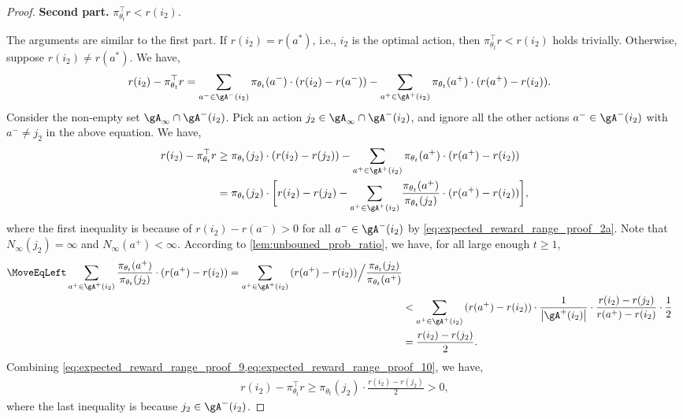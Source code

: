 \begin{proof}
\textbf{Second part.} $\pi_{\theta_t}^\top r < r(i_2)$.

The arguments are similar to the first part. If $r(i_2) = r(a^*)$, i.e., $i_2$ is the optimal action, then $\pi_{\theta_t}^\top r < r(i_2)$ holds trivially. Otherwise, suppose $r(i_2) \ne r(a^*)$. We have,
\begin{align}
\label{eq:expected_reward_range_proof_8}
    r(i_2) - \pi_{\theta_t}^\top r &= \sum_{a^- \in \gA^-(i_2)}{ \pi_{\theta_t}(a^-) \cdot (r(i_2) - r(a^-) ) } - \sum_{a^+ \in \gA^+(i_2)}{ \pi_{\theta_t}(a^+) \cdot ( r(a^+) - r(i_2)) }.
\end{align}
Consider the non-empty set $\gA_\infty \cap \gA^-(i_2)$. Pick an action $j_2 \in \gA_\infty \cap \gA^-(i_2)$, and ignore all the other actions $a^- \in \gA^-(i_2)$ with $a^- \ne j_2$ in the above equation. We have,
\begin{align}
\label{eq:expected_reward_range_proof_9}
    r(i_2) - \pi_{\theta_t}^\top r &\ge \pi_{\theta_t}(j_2) \cdot (r(i_2) - r(j_2) ) - \sum_{a^+ \in \gA^+(i_2)}{ \pi_{\theta_t}(a^+) \cdot ( r(a^+) - r(i_2)) } \\
    &=\pi_{\theta_t}(j_2) \cdot \bigg[ r(i_2) - r(j_2) - \sum_{a^+ \in \gA^+(i_2)}{ \frac{ \pi_{\theta_t}(a^+)}{\pi_{\theta_t}(j_2)} \cdot ( r(a^+) - r(i_2)) } \bigg],
\end{align}
where the first inequality is because of $r(i_2) - r(a^-) > 0$ for all $a^- \in \gA^-(i_2)$ by \cref{eq:expected_reward_range_proof_2a}. Note that $N_\infty(j_2) = \infty$ and $N_\infty(a^+) < \infty$. According to \cref{lem:unbouned_prob_ratio}, we have, for all large enough $t \ge 1$, 
\begin{align}
\label{eq:expected_reward_range_proof_10}
\MoveEqLeft
    \sum_{a^+ \in \gA^+(i_2)}{ \frac{ \pi_{\theta_t}(a^+)}{\pi_{\theta_t}(j_2)} \cdot ( r(a^+) - r(i_2)) } = \sum_{a^+ \in \gA^+(i_2)}{ ( r(a^+) - r(i_2)) \Big/ \frac{\pi_{\theta_t}(j_2)}{ \pi_{\theta_t}(a^+)}  } \\
    &< \sum_{a^+ \in \gA^+(i_2)}{ ( r(a^+) - r(i_2)) \cdot \frac{1}{\big| \gA^+(i_2) \big| } \cdot \frac{r(i_2) - r(j_2)}{r(a^+) - r(i_2)} \cdot \frac{1}{2} } \\
    &= \frac{r(i_2) - r(j_2)}{2}.
\end{align}
Combining \cref{eq:expected_reward_range_proof_9,eq:expected_reward_range_proof_10}, we have,
\begin{align}
    r(i_2) - \pi_{\theta_t}^\top r \ge \pi_{\theta_t}(j_2) \cdot \frac{r(i_2) - r(j_2)}{2} > 0,
\end{align}
where the last inequality is because  $j_2 \in \gA^-(i_2)$.
\end{proof}

